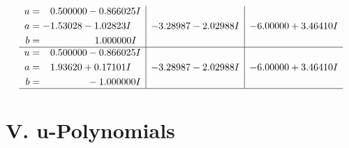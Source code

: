 \documentclass[1p]{elsarticle_modified}
\theoremstyle{definition}
\begin{document}
$$\begin{array}{c|c|c}
\begin{aligned}
u &= \phantom{-}0.500000 - 0.866025 I \\
a &= -1.53028 - 1.02823 I \\
b &= \phantom{-0.000000 -}1.000000 I\end{aligned}
 & -3.28987 - 2.02988 I & -6.00000 + 3.46410 I \\ \hline\begin{aligned}
u &= \phantom{-}0.500000 - 0.866025 I \\
a &= \phantom{-}1.93620 + 0.17101 I \\
b &= \phantom{-0.000000 } -1.000000 I\end{aligned}
 & -3.28987 - 2.02988 I & -6.00000 + 3.46410 I\\
 \hline 
 \end{array}$$\newpage
\newpage\renewcommand{\arraystretch}{1}
\centering \section*{ V. u-Polynomials}
\end{document}
